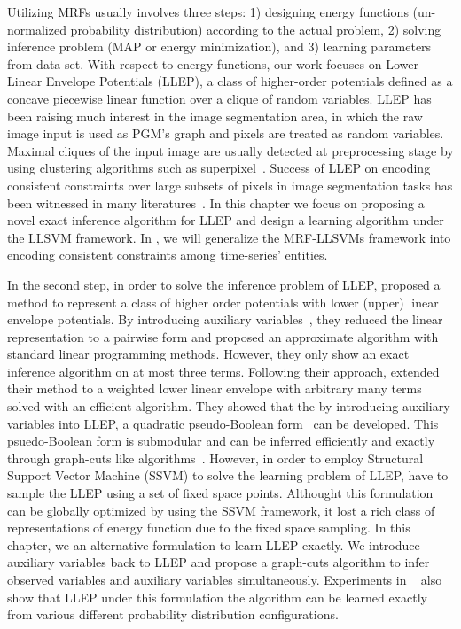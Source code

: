 Utilizing MRFs usually involves three steps: 1) designing energy
functions (un-normalized probability distribution) according to
the actual problem, 2) solving inference problem (MAP or energy
minimization), and 3) learning parameters from data set. With
respect to energy functions, our work focuses on Lower Linear
Envelope Potentials (LLEP), a class of higher-order potentials
defined as a concave piecewise linear function over a clique of
random variables. LLEP has been raising much interest in the
image segmentation area, in which the raw image input is used as
PGM's graph and pixels are treated as random variables. Maximal
cliques of the input image are usually detected at preprocessing
stage by using clustering algorithms such as
superpixel~\cite{achanta2012slic}. Success of LLEP on encoding
consistent constraints over large subsets of pixels in image
segmentation tasks has been witnessed in many
literatures~\cite{Kohli:CVPR07,Nowozin:2011, Song2015}. In this
chapter we focus on proposing a novel exact inference algorithm
for LLEP and design a learning algorithm under the LLSVM
framework. In , we will generalize the
MRF-LLSVMs framework into encoding consistent constraints among
time-series' entities.

In the second step, in order to solve the inference problem of
LLEP,  proposed a method to represent a
class of higher order potentials with lower (upper) linear
envelope potentials. By introducing auxiliary
variables~\cite{Kohli:CVPR10}, they reduced the linear
representation to a pairwise form and proposed an approximate
algorithm with standard linear programming methods. However, they
only show an exact inference algorithm on at most three terms.
Following their approach,  extended their
method to a weighted lower linear envelope with arbitrary many
terms solved with an efficient algorithm. They showed that the by
introducing auxiliary variables into LLEP, a quadratic
pseudo-Boolean form~\cite{Boros:MATH02} can be developed. This
psuedo-Boolean form is submodular and can be inferred efficiently
and exactly through graph-cuts like
algorithms~\cite{Boykov:ICCV01}. However, in order to employ
Structural Support Vector Machine (SSVM) to solve the learning
problem of LLEP,  have to sample the LLEP
using a set of fixed space points. Althought this formulation can
be globally optimized by using the SSVM framework, it lost a rich
class of representations of energy function due to the fixed
space sampling. In this chapter, we an alternative formulation to
learn LLEP exactly. We introduce auxiliary variables back to LLEP
and propose a graph-cuts algorithm to infer observed variables
and auxiliary variables simultaneously. Experiments in
~ also show that LLEP under this
formulation the algorithm can be learned exactly from various
different probability distribution configurations.


